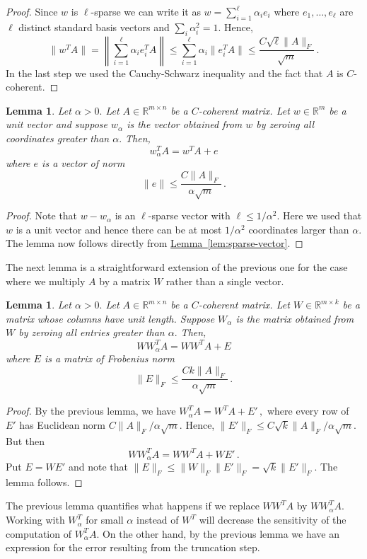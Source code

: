 \documentclass[letterpaper,11pt]{article}
\newtheorem{lemma}[theorem]{Lemma}
\theoremstyle{definition}
\newcommand{\lemmalabel}[1]{\label{lem:#1}}
\newcommand{\lemmaref}[1]{\hyperref[lem:#1]{Lemma~\ref{lem:#1}}}
\newcommand{\mper}{\,.}
\newcommand{\mcom}{\,,}
\renewcommand{\le}{\leqslant}
\newcommand{\R}{\mathbb{R}}
\begin{document}
\begin{proof}
Since $w$ is $\ell$-sparse we can write it as $w=\sum_{i=1}^\ell\alpha_ie_i$
where $e_1,\dots,e_\ell$ are $\ell$ distinct standard basis vectors
and $\sum_i \alpha_i^2=1.$
Hence,
\[
\|w^TA\| = \left\|\sum_{i=1}^\ell\alpha_i e_i^TA\right\|
\le \sum_{i=1}^\ell \alpha_i\|e_i^TA\|
\le \frac{C\sqrt{\ell}\|A\|_F}{\sqrt{m}}\mper
\]
In the last step we used the Cauchy-Schwarz inequality and the fact that $A$ is
$C$-coherent.
\end{proof}

\begin{lemma}
Let $\alpha>0.$
Let $A\in\R^{m\times n}$ be a $C$-coherent matrix.
Let $w\in\R^m$ be a unit vector and suppose $w_\alpha$ is the vector obtained
from $w$ by zeroing all coordinates greater than $\alpha.$ Then,
\[
w_\alpha^TA = w^TA + e
\]
where $e$ is a vector of norm
\[
\|e\|\le\frac{C\|A\|_F}{\alpha\sqrt{m}}\mper
\]
\end{lemma}

\begin{proof}
Note that $w-w_\alpha$ is an $\ell$-sparse vector with $\ell\le1/\alpha^2.$
Here we used that $w$ is a unit vector and hence there can be at most
$1/\alpha^2$ coordinates larger than $\alpha.$ The lemma now follows directly
from \lemmaref{sparse-vector}.
\end{proof}

The next lemma is a straightforward extension of the previous one for the case
where we multiply $A$ by a matrix $W$ rather than a single vector.
\begin{lemma}\lemmalabel{truncation-error}
Let $\alpha>0.$
Let $A\in\R^{m\times n}$ be a $C$-coherent matrix.
Let $W\in\R^{m\times k}$ be a matrix whose columns have unit length.
Suppose $W_\alpha$ is the matrix obtained
from $W$ by zeroing all entries greater than $\alpha.$ Then,
\[
WW_\alpha^TA = WW^TA + E
\]
where $E$ is a matrix of Frobenius norm
\[
\|E\|_F\le\frac{Ck\|A\|_F}{\alpha\sqrt{m}}\mper
\]
\end{lemma}
\begin{proof}
By the previous lemma,
we have
$W_\alpha^TA = W^TA + E'\mcom$
where every row of $E'$ has Euclidean norm
$C\|A\|_F/\alpha\sqrt{m}.$  Hence,
$\|E'\|_F\le C\sqrt{k}\|A\|_F/\alpha\sqrt{m}.$
But then
\[
WW_\alpha^TA = WW^TA + WE'\mper
\]
Put $E=WE'$ and note that $\|E\|_F\le\|W\|_F\|E'\|_F=\sqrt{k}\|E'\|_F.$ The
lemma follows.
\end{proof}

The previous lemma quantifies what happens if we replace $WW^TA$ by
$WW_\alpha^TA.$ Working with $W_\alpha^T$ for small $\alpha$ instead of $W^T$
will decrease the sensitivity of the computation of $W_\alpha^TA.$  On the
other hand, by the previous lemma we have an expression for the error
resulting from the truncation step.
\end{document}
